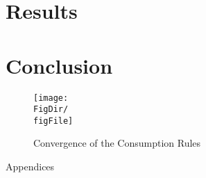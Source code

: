 \documentclass[titlepage]{\econtex}\providecommand{\texname}{BufferStockTheory}
\providecommand{\FigDir}{Figures}
\providecommand{\TableDir}{Tables}
\begin{document}







\hypertarget{Results}{}
\section{Results}


\hypertarget{Conclusion}{}
\section{Conclusion}







\providecommand{\figName}{Convergence-of-the-Consumption-Rules}
\providecommand{\figFile}{cFuncsConverge}
\hypertarget{\figFile}{}
\hypertarget{\figName}{}
\begin{figure}[tbp]
\centerline{\texttt{[image: \\FigDir/\\figFile]}}
\caption{Convergence of the Consumption Rules}
\label{fig:\figFile}
\end{figure}














\clearpage\vfill\eject

\appendix

\centerline{\LARGE Appendices}\vspace{0.2in}




\clearpage\vfill\eject

\normalsize



\end{document}
